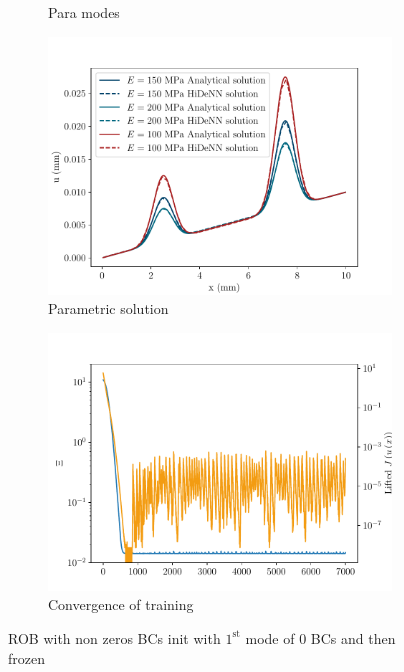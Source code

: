 \begin{figure}
\begin{subfigure}[t]{0.5\linewidth}
    \caption{Para modes}
\end{subfigure}  
  \begin{subfigure}[t]{0.5\linewidth}
    \centering
    \includegraphics[width=\linewidth]{Figures/Para_displacementsROM_1Para_np_50_order_1_nmodes_1_npara_1BCs_init_frozen.pdf}
    \caption{Parametric solution}
\end{subfigure} 
  \begin{subfigure}[t]{0.5\linewidth}
    \centering
    \includegraphics[width=\linewidth]{Figures/Non0BCs_init_frozen.pdf}
    \caption{Convergence of training}
\end{subfigure} 
    \caption{ROB with non zeros BCs init with $1^{\text{st}}$ mode of $0$ BCs and then frozen}
    \label{fig:BCsInitFrozen}
\end{figure}



